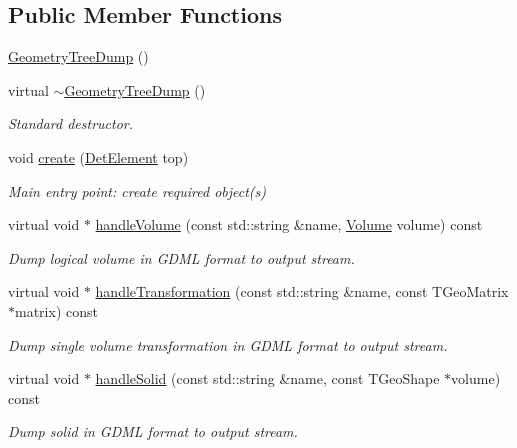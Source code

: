 \subsection*{Public Member Functions}
\begin{DoxyCompactItemize}
\item 
\hyperlink{class_d_d4hep_1_1_geometry_1_1_geometry_tree_dump_a47f8f93072e4f019169b6f7853c4cb77}{Geometry\+Tree\+Dump} ()
\item 
virtual \hyperlink{class_d_d4hep_1_1_geometry_1_1_geometry_tree_dump_a3d194c9411bf2c915462a3f086d6b8f5}{$\sim$\+Geometry\+Tree\+Dump} ()
\begin{DoxyCompactList}\small\item\em Standard destructor. \end{DoxyCompactList}\item 
void \hyperlink{class_d_d4hep_1_1_geometry_1_1_geometry_tree_dump_a597ecc457c64cbfdf0fe06301d2d458d}{create} (\hyperlink{class_d_d4hep_1_1_geometry_1_1_det_element}{Det\+Element} top)
\begin{DoxyCompactList}\small\item\em Main entry point\+: create required object(s) \end{DoxyCompactList}\item 
virtual void $\ast$ \hyperlink{class_d_d4hep_1_1_geometry_1_1_geometry_tree_dump_adadccb419b182e479e87f793447700f2}{handle\+Volume} (const std\+::string \&name, \hyperlink{class_d_d4hep_1_1_geometry_1_1_volume}{Volume} volume) const
\begin{DoxyCompactList}\small\item\em Dump logical volume in G\+D\+ML format to output stream. \end{DoxyCompactList}\item 
virtual void $\ast$ \hyperlink{class_d_d4hep_1_1_geometry_1_1_geometry_tree_dump_aa7d24d8560d19592d2547688f7c0e83e}{handle\+Transformation} (const std\+::string \&name, const T\+Geo\+Matrix $\ast$matrix) const
\begin{DoxyCompactList}\small\item\em Dump single volume transformation in G\+D\+ML format to output stream. \end{DoxyCompactList}\item 
virtual void $\ast$ \hyperlink{class_d_d4hep_1_1_geometry_1_1_geometry_tree_dump_ac406833fab65fe5a54aa8cb983a30bd5}{handle\+Solid} (const std\+::string \&name, const T\+Geo\+Shape $\ast$volume) const
\begin{DoxyCompactList}\small\item\em Dump solid in G\+D\+ML format to output stream. \end{DoxyCompactList}\item 

\end{DoxyCompactItemize}
